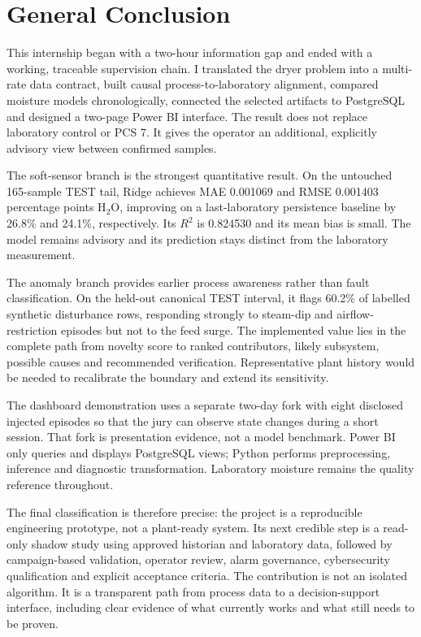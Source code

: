 \chapter*{General Conclusion}

This internship began with a two-hour information gap and ended with a working, traceable supervision chain. I translated the dryer problem into a multi-rate data contract, built causal process-to-laboratory alignment, compared moisture models chronologically, connected the selected artifacts to PostgreSQL and designed a two-page Power BI interface. The result does not replace laboratory control or PCS 7. It gives the operator an additional, explicitly advisory view between confirmed samples.

The soft-sensor branch is the strongest quantitative result. On the untouched 165-sample TEST tail, Ridge achieves MAE 0.001069 and RMSE 0.001403 percentage points H$_2$O, improving on a last-laboratory persistence baseline by 26.8\% and 24.1\%, respectively. Its $R^2$ is 0.824530 and its mean bias is small. The model remains advisory and its prediction stays distinct from the laboratory measurement.

The anomaly branch provides earlier process awareness rather than fault classification. On the held-out canonical TEST interval, it flags 60.2\% of labelled synthetic disturbance rows, responding strongly to steam-dip and airflow-restriction episodes but not to the feed surge. The implemented value lies in the complete path from novelty score to ranked contributors, likely subsystem, possible causes and recommended verification. Representative plant history would be needed to recalibrate the boundary and extend its sensitivity.

The dashboard demonstration uses a separate two-day fork with eight disclosed injected episodes so that the jury can observe state changes during a short session. That fork is presentation evidence, not a model benchmark. Power BI only queries and displays PostgreSQL views; Python performs preprocessing, inference and diagnostic transformation. Laboratory moisture remains the quality reference throughout.

The final classification is therefore precise: the project is a reproducible engineering prototype, not a plant-ready system. Its next credible step is a read-only shadow study using approved historian and laboratory data, followed by campaign-based validation, operator review, alarm governance, cybersecurity qualification and explicit acceptance criteria. The contribution is not an isolated algorithm. It is a transparent path from process data to a decision-support interface, including clear evidence of what currently works and what still needs to be proven.

